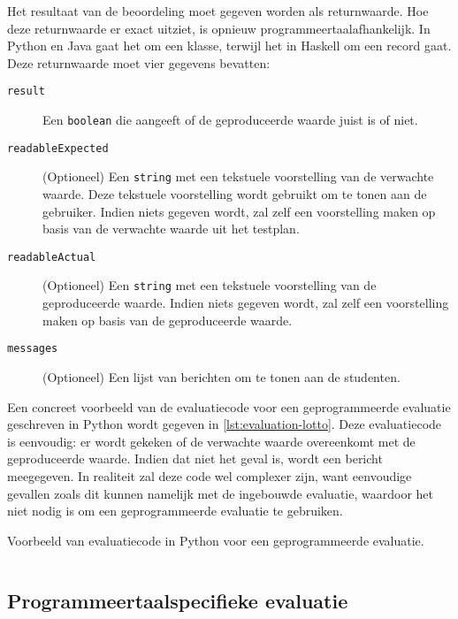 Het resultaat van de beoordeling moet gegeven worden als returnwaarde.
Hoe deze returnwaarde er exact uitziet, is opnieuw programmeertaalafhankelijk.
In Python en Java gaat het om een klasse, terwijl het in Haskell om een record gaat.
Deze returnwaarde moet vier gegevens bevatten:

\begin{description}
    \item[\texttt{result}] Een \texttt{boolean} die aangeeft of de geproduceerde waarde juist is of niet.
    \item[\texttt{readableExpected}] (Optioneel) Een \texttt{string} met een tekstuele voorstelling van de verwachte waarde.
    Deze tekstuele voorstelling wordt gebruikt om te tonen aan de gebruiker.
    Indien niets gegeven wordt, zal \tested{} zelf een voorstelling maken op basis van de verwachte waarde uit het testplan.
    \item[\texttt{readableActual}] (Optioneel) Een \texttt{string} met een tekstuele voorstelling van de geproduceerde waarde.
    Indien niets gegeven wordt, zal \tested{} zelf een voorstelling maken op basis van de geproduceerde waarde.
    \item[\texttt{messages}] (Optioneel) Een lijst van berichten om te tonen aan de studenten.
\end{description}

Een concreet voorbeeld van de evaluatiecode voor een geprogrammeerde evaluatie geschreven in Python wordt gegeven in \cref{lst:evaluation-lotto}.
Deze evaluatiecode is eenvoudig: er wordt gekeken of de verwachte waarde overeenkomt met de geproduceerde waarde.
Indien dat niet het geval is, wordt een bericht meegegeven.
In realiteit zal deze code wel complexer zijn, want eenvoudige gevallen zoals dit kunnen namelijk met de ingebouwde evaluatie, waardoor het niet nodig is om een geprogrammeerde evaluatie te gebruiken.

\begin{listing}
    \caption{Voorbeeld van evaluatiecode in Python voor een geprogrammeerde evaluatie.}
    \label{lst:evaluation-lotto}
    \inputminted{python}{code/evaluator.py}
\end{listing}

\subsection{Programmeertaalspecifieke evaluatie}\label{subsec:programmeertaalspecifieke-evaluatie}


